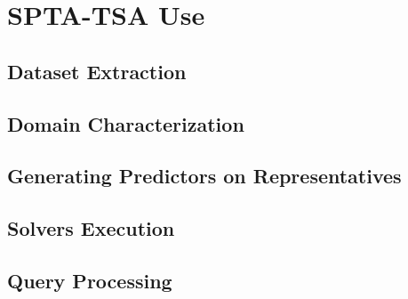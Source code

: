 \chapter{SPTA-TSA Use}\label{anexoA}

\section{Dataset Extraction}




\section{Domain Characterization}

\section{Generating Predictors on Representatives}

\section{Solvers Execution}

\section{Query Processing}